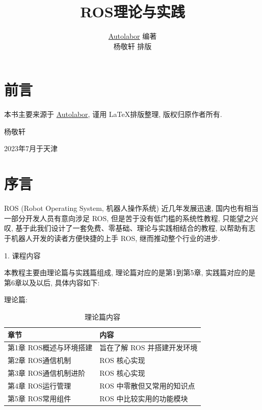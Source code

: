 \documentclass[openany, fontset=windowsold]{ctexbook}
\theoremstyle{kaiti}
\theoremstyle{normal}
\begin{document}
\title{\heiti\Huge ROS理论与实践 \vspace{0.5cm}}
\author{\LARGE\kaishu \href{http://www.autolabor.com.cn/book/ROSTutorials/index.html}{Autolabor} 编著 \vspace*{0.5cm} \\ \LARGE\kaishu 杨敬轩 \quad 排版 \vspace{1cm}}

\maketitle
\thispagestyle{empty}

\frontmatter
{}
\chapter*{前言}

本书主要来源于 \href{http://www.autolabor.com.cn/book/ROSTutorials/index.html}{Autolabor}, 谨用 \LaTeX 排版整理, 版权归原作者所有.

\vspace*{1cm}

\hfill {\kaishu 杨敬轩}

\hfill 2023年7月于天津

\chapter*{序言}

ROS (Robot Operating System, 机器人操作系统) 近几年发展迅速, 国内也有相当一部分开发人员有意向涉足 ROS, 但是苦于没有低门槛的系统性教程, 只能望之兴叹, 基于此我们设计了一套免费、零基础、理论与实践相结合的教程, 以帮助有志于机器人开发的读者方便快捷的上手 ROS, 继而推动整个行业的进步.

1. 课程内容

本教程主要由理论篇与实践篇组成, 理论篇对应的是第1到第5章, 实践篇对应的是第6章以及以后, 具体内容如下:

理论篇:

\begin{table}[!h]
  \centering
  \caption{理论篇内容}
  \label{tab:theory_outline}
  \begin{tabular}{ll}
    \hline
    章节 &	内容 \\
    \hline
    第1章 ROS概述与环境搭建 &	旨在了解 ROS 并搭建开发环境 \\
    第2章 ROS通信机制 &	ROS 核心实现 \\
    第3章 ROS通信机制进阶 &	ROS 核心实现 \\
    第4章 ROS运行管理 &	ROS 中零散但又常用的知识点 \\
    第5章 ROS常用组件 &	ROS 中比较实用的功能模块 \\
    \hline
  \end{tabular}
\end{table}
\end{document}
